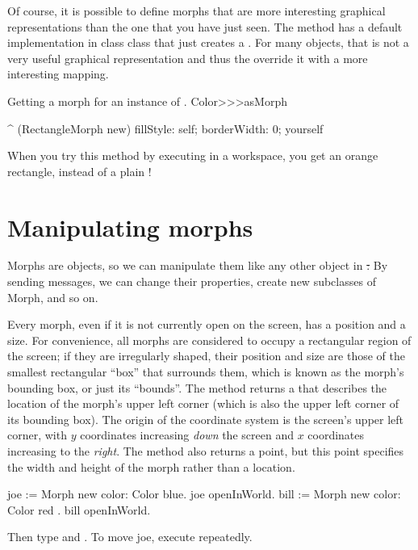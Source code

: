 \documentclass[a4paper,10pt,twoside]{book}
\begin{document}
Of course, it is possible to define morphs that are more interesting graphical representations than the one that you have just seen.
The method  has a default implementation in class  class that just creates a .
For many objects, that is not a very useful graphical representation and thus the override it with a more interesting mapping.


\begin{method}{Getting a morph for an instance of .}
Color>>>asMorph

	^ (RectangleMorph new)
		fillStyle: self;
		borderWidth: 0;
		yourself
\end{method}
\noindent

When you try this method by executing   in a workspace, you get an orange rectangle, instead of a plain !

\section{Manipulating morphs}

Morphs are objects, so we can manipulate them like any other object in \st:
By sending messages, we can change their properties, create new subclasses of Morph, and so on.

Every morph, even if it is not currently open on the screen, has a position and a size.
For convenience, all morphs are considered to occupy a rectangular region of the screen; if they are irregularly shaped, their position and size are those of the smallest rectangular ``box'' that surrounds them, which is known as the morph's bounding box, or just its ``bounds''.
The  method returns a  that describes the location of the morph's upper left corner (which is also the upper left corner of its bounding box).
The origin of the coordinate system is the screen's upper left corner, with $y$ coordinates increasing \emph{down} the screen and $x$ coordinates increasing to the \emph{right}.
The  method also returns a point, but this point specifies the width and height of the morph rather than a location.

\begin{code}{}
joe := Morph new color: Color blue.
joe openInWorld.
bill := Morph new color: Color red .
bill openInWorld.
\end{code}
\noindent
Then type  and .
To move joe, execute  repeatedly.
\end{document}

